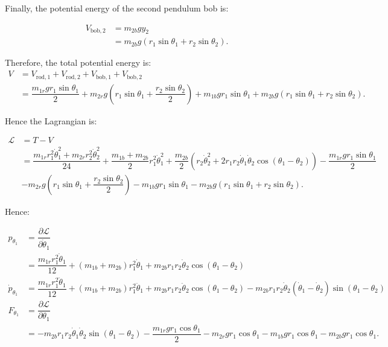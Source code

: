 \documentclass[12pt,a4paper,portrait]{article}
\begin{document}
	Finally, the potential energy of the second pendulum bob is:
	
	\begin{align*}
		V_{\mathrm{bob}, 2} &= m_{2b} gy_2 \\
		&= m_{2b} g \left(r_1 \sin{\theta_1} + r_2 \sin{\theta_2}\right).
	\end{align*}
	
	Therefore, the total potential energy is:
	\begin{align*}
		V &= V_{\mathrm{rod}, 1} + V_{\mathrm{rod}, 2} + V_{\mathrm{bob}, 1} + V_{\mathrm{bob}, 2} \\
		&= \dfrac{m_{1r}gr_1 \sin{\theta_1}}{2} + m_{2r}g \left(r_1 \sin{\theta_1} + \dfrac{r_2\sin{\theta_2}}{2}\right) + m_{1b}gr_1 \sin{\theta_1} + m_{2b} g \left(r_1 \sin{\theta_1} + r_2 \sin{\theta_2}\right).
	\end{align*}
	
	Hence the Lagrangian is:
	
	\begin{align*}
		\mathcal{L} &= T - V \\
		&= \dfrac{m_{1r} r_1^2 \dot{\theta}_1^2 + m_{2r}r_2^2 \dot{\theta}_2^2}{24} + \dfrac{m_{1b}+m_{2b}}{2}r_1^2 \dot{\theta}_1^2 + \dfrac{m_{2b}}{2} \left(r_2\dot{\theta}_2^2 + 2r_1 r_2 \dot{\theta}_1 \dot{\theta}_2 \cos{\left(\theta_1 - \theta_2\right)}\right) - \dfrac{m_{1r}gr_1 \sin{\theta_1}}{2} \\
		&-m_{2r}g \left(r_1 \sin{\theta_1} + \dfrac{r_2\sin{\theta_2}}{2}\right) - m_{1b}gr_1 \sin{\theta_1} - m_{2b} g \left(r_1 \sin{\theta_1} + r_2 \sin{\theta_2}\right).
	\end{align*}
	
	Hence:
	
	\begin{align*}
		p_{\theta_1} &= \dfrac{\partial \mathcal{L}}{\partial \dot{\theta}_1} \\
		&= \dfrac{m_{1r}r_1^2 \dot{\theta}_1}{12} + (m_{1b}+m_{2b}) r_1^2 \dot{\theta}_1 + m_{2b}r_1 r_2 \dot{\theta}_2 \cos{\left(\theta_1-\theta_2\right)} \\
		\dot{p}_{\theta_1} &= \dfrac{m_{1r} r_1^2 \ddot{\theta}_1}{12} + (m_{1b}+m_{2b})r_1^2 \ddot{\theta}_1 + m_{2b}r_1 r_2 \ddot{\theta}_2\cos{(\theta_1-\theta_2)} - m_{2b}r_1 r_2 \dot{\theta}_2\left(\dot{\theta}_1 - \dot{\theta}_2\right)\sin{(\theta_1-\theta_2)} \\
		F_{\theta_1} &= \dfrac{\partial \mathcal{L}}{\partial \theta_1} \\
		&= -m_{2b}r_1r_2\dot{\theta}_1\dot{\theta}_2 \sin{(\theta_1-\theta_2)} - \dfrac{m_{1r}gr_1 \cos{\theta_1}}{2} -m_{2r}gr_1 \cos{\theta_1} -m_{1b}gr_1 \cos{\theta_1} -m_{2b}gr_1 \cos{\theta_1}.
	\end{align*}
	
\end{document}
